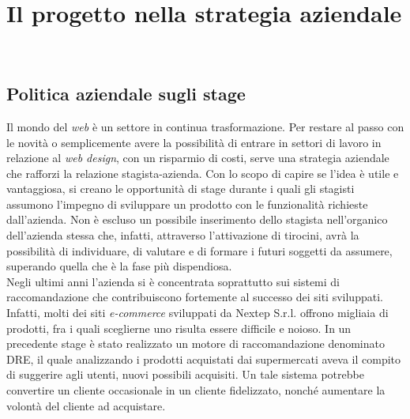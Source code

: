 
\chapter{Il progetto nella strategia aziendale}
\label{cap:processi-metodologie}

\\


\section{Politica aziendale sugli stage}
Il mondo del \textit{web} è un settore in continua trasformazione. Per restare al passo con le novità o semplicemente avere la possibilità di entrare in settori di lavoro in relazione al \textit{web design}, con un risparmio di costi, serve una strategia aziendale che rafforzi la relazione stagista-azienda. Con lo scopo di capire se l'idea è utile e vantaggiosa, si creano le opportunità di stage durante i quali gli stagisti assumono l'impegno di sviluppare un prodotto con le funzionalità richieste dall'azienda. Non è escluso un possibile inserimento dello stagista nell'organico dell'azienda stessa che, infatti, attraverso l'attivazione di tirocini, avrà la possibilità di individuare, di valutare e di formare i futuri soggetti da assumere, superando quella che è la fase più dispendiosa.\\
Negli ultimi anni l'azienda si è concentrata soprattutto sui sistemi di raccomandazione che contribuiscono fortemente al successo dei siti sviluppati. Infatti, molti dei siti \textit{e-commerce} sviluppati da Nextep S.r.l. offrono migliaia di prodotti, fra i quali sceglierne uno risulta essere difficile e noioso.  In un precedente stage è stato realizzato un motore di raccomandazione denominato DRE, il quale analizzando i prodotti acquistati dai supermercati aveva il compito di suggerire agli utenti, nuovi possibili acquisiti. Un tale sistema potrebbe convertire un cliente occasionale in un cliente fidelizzato, nonché aumentare la volontà del cliente ad acquistare. 


